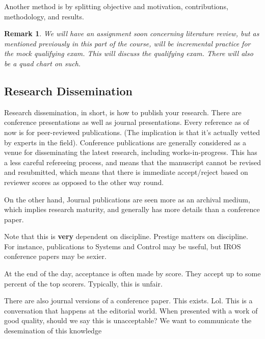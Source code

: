 \documentclass[10pt, oneside]{article}
\newtheorem{rem}{Remark}
\begin{document}
Another method is by splitting objective and motivation, contributions, methodology, and results. 

\begin{rem}
    We will have an assignment soon concerning literature review, but as mentioned previously in this part of the course, will be incremental practice for the mock qualifying exam. This will discuss the qualifying exam. There will also be a quad chart on such.
\end{rem}

\subsection{Research Dissemination}
Research dissemination, in short, is how to publish your research. 
There are conference presentations as well as journal presentations. Every reference as of now is for peer-reviewed publications. (The implication is that it's actually vetted by experts in the field). Conference publications are generally considered as a venue for disseminating the latest research, including works-in-progress. This has a less careful refereeing process, and means that the manuscript cannot be revised and resubmitted, which means that there is immediate accept/reject based on reviewer scores as opposed to the other way round. 

On the other hand, Journal publications are seen more as an archival medium, which implies research maturity, and generally has more details than a conference paper. 

Note that this is \textbf{very} dependent on discipline. Prestige matters on discipline. For instance, publications to Systems and Control may be useful, but IROS conference papers may be sexier. 

At the end of the day, acceptance is often made by score. They accept up to some percent of the top scorers. Typically, this is unfair. 

There are also journal versions of a conference paper. This exists. Lol. This is a conversation that happens at the editorial world. When presented with a work of good quality, should we say this is unacceptable? We want to communicate the desemination of this knowledge 
\end{document}
